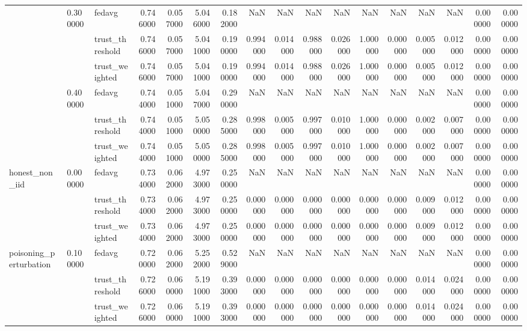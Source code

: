 \begin{tabular}{lllrrrrrrrrrrrrrr}
\cline{2-17}
 & \multirow[t]{3}{*}{0.300000} & fedavg & 0.746000 & 0.057000 & 5.046000 & 0.182000 & NaN & NaN & NaN & NaN & NaN & NaN & NaN & NaN & 0.000000 & 0.000000 \\
 &  & trust_threshold & 0.746000 & 0.057000 & 5.041000 & 0.190000 & 0.994000 & 0.014000 & 0.988000 & 0.026000 & 1.000000 & 0.000000 & 0.005000 & 0.012000 & 0.000000 & 0.000000 \\
 &  & trust_weighted & 0.746000 & 0.057000 & 5.041000 & 0.190000 & 0.994000 & 0.014000 & 0.988000 & 0.026000 & 1.000000 & 0.000000 & 0.005000 & 0.012000 & 0.000000 & 0.000000 \\
\cline{2-17}
 & \multirow[t]{3}{*}{0.400000} & fedavg & 0.744000 & 0.051000 & 5.047000 & 0.290000 & NaN & NaN & NaN & NaN & NaN & NaN & NaN & NaN & 0.000000 & 0.000000 \\
 &  & trust_threshold & 0.744000 & 0.051000 & 5.050000 & 0.285000 & 0.998000 & 0.005000 & 0.997000 & 0.010000 & 1.000000 & 0.000000 & 0.002000 & 0.007000 & 0.000000 & 0.000000 \\
 &  & trust_weighted & 0.744000 & 0.051000 & 5.050000 & 0.285000 & 0.998000 & 0.005000 & 0.997000 & 0.010000 & 1.000000 & 0.000000 & 0.002000 & 0.007000 & 0.000000 & 0.000000 \\
\cline{1-17} \cline{2-17}
\multirow[t]{3}{*}{honest_non_iid} & \multirow[t]{3}{*}{0.000000} & fedavg & 0.734000 & 0.062000 & 4.973000 & 0.250000 & NaN & NaN & NaN & NaN & NaN & NaN & NaN & NaN & 0.000000 & 0.000000 \\
 &  & trust_threshold & 0.734000 & 0.062000 & 4.973000 & 0.250000 & 0.000000 & 0.000000 & 0.000000 & 0.000000 & 0.000000 & 0.000000 & 0.009000 & 0.012000 & 0.000000 & 0.000000 \\
 &  & trust_weighted & 0.734000 & 0.062000 & 4.973000 & 0.250000 & 0.000000 & 0.000000 & 0.000000 & 0.000000 & 0.000000 & 0.000000 & 0.009000 & 0.012000 & 0.000000 & 0.000000 \\
\cline{1-17} \cline{2-17}
\multirow[t]{12}{*}{poisoning_perturbation} & \multirow[t]{3}{*}{0.100000} & fedavg & 0.720000 & 0.062000 & 5.252000 & 0.529000 & NaN & NaN & NaN & NaN & NaN & NaN & NaN & NaN & 0.000000 & 0.000000 \\
 &  & trust_threshold & 0.726000 & 0.060000 & 5.191000 & 0.393000 & 0.000000 & 0.000000 & 0.000000 & 0.000000 & 0.000000 & 0.000000 & 0.014000 & 0.024000 & 0.000000 & 0.000000 \\
 &  & trust_weighted & 0.726000 & 0.060000 & 5.191000 & 0.393000 & 0.000000 & 0.000000 & 0.000000 & 0.000000 & 0.000000 & 0.000000 & 0.014000 & 0.024000 & 0.000000 & 0.000000 \\

\end{tabular}

